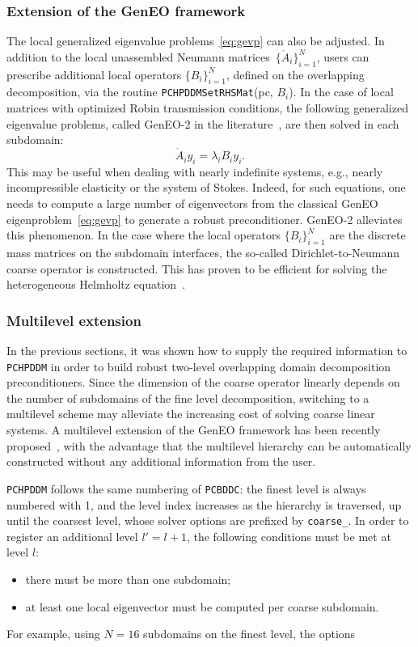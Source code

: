 \documentclass[3p,11pt]{elsarticle}
\newcommand{\pk}[1]{\texttt{#1}}
\begin{document}
    \subsubsection{Extension of the GenEO framework}
The local generalized eigenvalue problems~\cref{eq:gevp} can also be adjusted.
In addition to the local unassembled Neumann matrices~$\{\mathring{A}_i\}_{i=1}^N$,
users can prescribe additional local operators $\{B_i\}_{i=1}^N$, defined on
the overlapping decomposition, via the routine \pk{PCHPDDMSetRHSMat}(pc, $B_i$).
In the case of local matrices with optimized Robin transmission conditions, the
following generalized eigenvalue problems, called GenEO-2 in the
literature~\cite{haferssas2017soras}, are then solved in each subdomain:
\begin{equation*}
    \mathring{A}_i y_i = \lambda_i B_i y_i.
\end{equation*}
This may be useful when dealing with nearly indefinite systems, e.g., nearly
incompressible elasticity or the system of Stokes. Indeed, for such equations,
one needs to compute a large number of eigenvectors from the classical GenEO
eigenproblem~\cref{eq:gevp} to generate a robust preconditioner. GenEO-2
alleviates this phenomenon. In the case where the local operators
$\{B_i\}_{i=1}^N$ are the discrete mass matrices on the subdomain interfaces,
the so-called Dirichlet-to-Neumann coarse operator is constructed. This has
proven to be efficient for solving the heterogeneous Helmholtz
equation~\cite{conen2014coarse}.

    \subsubsection{Multilevel extension}\label{sec:ml}
In the previous sections, it was shown how to supply the required information to
\pk{PCHPDDM} in order to build robust two-level overlapping domain decomposition preconditioners.
Since the dimension of the
coarse operator linearly depends on the number of subdomains of the
fine level decomposition, switching to a multilevel scheme may alleviate the increasing cost
of solving coarse linear systems. A multilevel extension of the GenEO framework has been recently
proposed~\cite{aldaas2019multi}, with the advantage that the multilevel hierarchy can be
automatically constructed without any additional information from the user.

\pk{PCHPDDM} follows the same numbering of \pk{PCBDDC}:
the finest level is always numbered with 1, and the level index increases as the hierarchy is traversed, up until
the coarsest level, whose solver options are prefixed by \pk{coarse\_}. In order to
register an additional level $l' = l+1$, the following conditions must be met at
level $l$:
\begin{itemize}
    \item there must be more than one subdomain;
    \item at least one local eigenvector must be computed per coarse subdomain.
\end{itemize}
For example, using $N = 16$ subdomains on the finest level, the options
\end{document}
